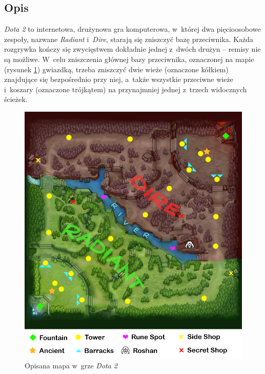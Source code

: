 \documentclass[pl]{minipw} %
\begin{document}
\subsection{Opis}
\textit{Dota 2} to internetowa, drużynowa gra komputerowa, w~której dwa pięcioosobowe zespoły, nazwane \textit{Radiant} i~\textit{Dire}, starają się zniszczyć bazę przeciwnika. Każda rozgrywka kończy się zwycięstwem dokładnie jednej z~dwóch drużyn -- remisy nie są możliwe. W~celu zniszczenia głównej bazy przeciwnika, oznaczonej na mapie (rysunek \ref{dota2_map}) gwiazdką, trzeba zniszczyć dwie wieże (oznaczone kółkiem) znajdujące się bezpośrednio przy niej, a~także wszystkie przeciwne wieże i~koszary (oznaczone trójkątem) na przynajmniej jednej z~trzech widocznych ścieżek.
\label{opis-dota}
\begin{figure}[H]
\includegraphics[width=\textwidth]{dota2_map.png}
\caption[Opisana mapa w~grze \textit{Dota 2}]{Opisana mapa w~grze \textit{Dota 2} \cite{dota2_map_src}} 
\label{dota2_map}
\end{figure}
\end{document}
